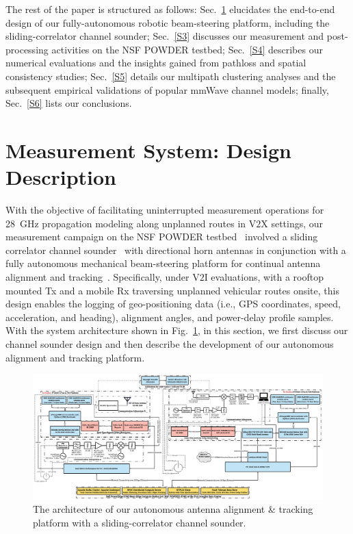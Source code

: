 \documentclass[12pt, draftcls, onecolumn]{IEEEtran}
\begin{document}
The rest of the paper is structured as follows: Sec.~\ref{S2} elucidates the end-to-end design of our fully-autonomous robotic beam-steering platform, including the sliding-correlator channel sounder; Sec.~\ref{S3} discusses our measurement and post-processing activities on the NSF POWDER testbed; Sec.~\ref{S4} describes our numerical evaluations and the insights gained from pathloss and spatial consistency studies; Sec.~\ref{S5} details our multipath clustering analyses and the subsequent empirical validations of popular mmWave channel models; finally, Sec.~\ref{S6} lists our conclusions.
\vspace{-4mm}

\section{Measurement System: Design Description}\label{S2}
With the objective of facilitating uninterrupted measurement operations for \SI{28}{\giga\hertz} propagation modeling along unplanned routes in V$2$X settings, our measurement campaign on the NSF POWDER testbed~\cite{POWDER} involved a sliding correlator channel sounder~\cite{Purdue} with directional horn antennas in conjunction with a fully autonomous mechanical beam-steering platform for continual antenna alignment and tracking~\cite{NRSM}. Specifically, under V$2$I evaluations, with a rooftop mounted Tx and a mobile Rx traversing unplanned vehicular routes onsite, this design enables the logging of geo-positioning data (i.e., GPS coordinates, speed, acceleration, and heading), alignment angles, and power-delay profile samples. With the system architecture shown in Fig.~\ref{F1}, in this section, we first discuss our channel sounder design and then describe the development of our autonomous alignment and tracking platform.
\begin{figure} [t]
    \centering
    \includegraphics[width=1.0\textwidth]{figs/system_architecture.jpg}
    \vspace{-6mm}
    \caption{The architecture of our autonomous antenna alignment \& tracking platform with a sliding-correlator channel sounder.}
    \label{F1}
\end{figure}
\end{document}
